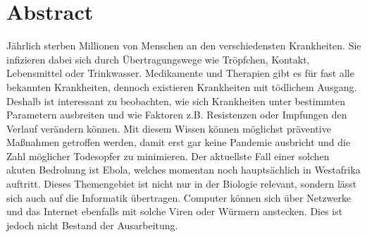\section*{Abstract}
Jährlich sterben Millionen von Menschen an den verschiedensten Krankheiten. Sie infizieren dabei sich durch Übertragungswege wie Tröpfchen, Kontakt, Lebensmittel oder Trinkwasser. Medikamente und Therapien gibt es für fast alle bekannten Krankheiten, dennoch existieren Krankheiten mit tödlichem Ausgang. 
Deshalb ist interessant zu beobachten, wie sich Krankheiten unter bestimmten Parametern ausbreiten und wie Faktoren z.B. Resistenzen oder Impfungen den Verlauf verändern können. Mit diesem Wissen können möglichst präventive Maßnahmen getroffen werden, damit erst gar keine Pandemie ausbricht und die Zahl möglicher Todesopfer zu minimieren. Der aktuellste Fall einer solchen akuten Bedrohung ist Ebola, welches momentan noch hauptsächlich in Westafrika auftritt. Dieses Themengebiet ist nicht nur in der Biologie relevant, sondern lässt sich auch auf die Informatik übertragen. Computer können sich über Netzwerke und das Internet ebenfalls mit solche Viren oder Würmern anstecken. Dies ist jedoch nicht Bestand der Ausarbeitung.